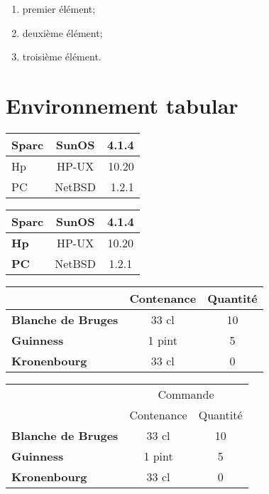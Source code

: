 \documentclass[a4paper,11pt]{article}
\begin{document}
\begin{enumerate}

\item premier élément;

\item deuxième élément;

\item troisième élément.

\end{enumerate}

\section{Environnement tabular}

\begin{tabular}{|l|c|r|}
\hline
Sparc & SunOS  & 4.1.4 \\
\hline
Hp     & HP-UX  & 10.20 \\
\hline
PC     & NetBSD & 1.2.1  \\
\hline 
\end{tabular}

\bigskip

\begin{tabular}{|p{5cm}|*{2}{c|}}
\hline
\bfseries Sparc & SunOS  & 4.1.4 \\
\hline
\bfseries Hp     & HP-UX  & 10.20 \\
\hline
\bfseries PC     & NetBSD & 1.2.1  \\
\hline 
\end{tabular}

\bigskip


\begin{tabular}{|p{5cm}|*{2}{c|}}
\hline
					                & Contenance & Quantité \\
\hline
\bfseries Blanche de Bruges & 33 cl            & 10          \\
\hline
\bfseries Guinness               & 1 pint           & 5            \\
\hline
\bfseries Kronenbourg         & 33 cl             & 0            \\
\hline
\end{tabular}

\bigskip

\begin{tabular}{|p{5cm}|*{2}{c|}}
\cline{2-3}
\multicolumn{1}{c|}{}        & \multicolumn{2}{c|}{Commande} \\
\cline{2-3}
\multicolumn{1}{c|}{}        & Contenance & Quantité \\
\hline
\bfseries Blanche de Bruges & 33 cl            & 10          \\
\hline
\bfseries Guinness               & 1 pint           & 5            \\
\hline
\bfseries Kronenbourg         & 33 cl             & 0            \\
\hline
\end{tabular}
\end{document}
